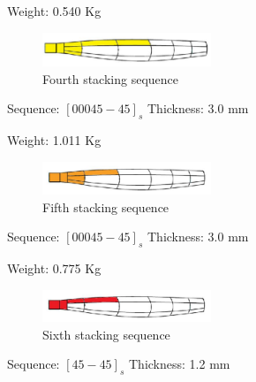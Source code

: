 \hspace{2cm}Weight: 0.540 Kg
\begin{figure}[H]
\begin{center}
  \includegraphics[width=0.45\textwidth]{p10}
\caption{Fourth stacking sequence  }
\label{fig:17}       %
\end{center}
\end{figure}
Sequence: $[0 0 0 45 -45]_s$	\hspace{1cm}Thickness: 3.0 mm 

\hspace{2cm}Weight: 1.011 Kg
\begin{figure}[H]
\begin{center}
  \includegraphics[width=0.45\textwidth]{p11}
\caption{Fifth stacking sequence  }
\label{fig:18}       %
\end{center}
\end{figure}
Sequence: $[0 0 0 45 -45]_s$	\hspace{1cm}Thickness: 3.0 mm 

\hspace{2cm}Weight: 0.775 Kg
\begin{figure}[H]
\begin{center}
  \includegraphics[width=0.45\textwidth]{p12}
\caption{Sixth stacking sequence  }
\label{fig:19}       %
\end{center}
\end{figure}
Sequence: $[45 -45]_s$	\hspace{1cm}Thickness: 1.2 mm 

